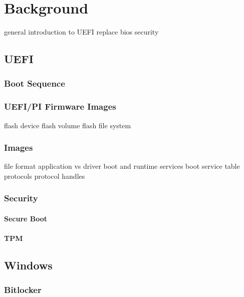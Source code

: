 %
\chapter{Background}

general introduction to UEFI
replace bios
security

\section{UEFI}
\subsection{Boot Sequence}

\subsection{UEFI/PI Firmware Images}
flash device
flash volume
flash file system

\subsection{Images}
file format
application vs driver
boot and runtime services
boot service table
protocols
protocol handles

\subsection{Security}
\subsubsection{Secure Boot}
\subsubsection{TPM}


\section{Windows}
\subsection{Bitlocker}



